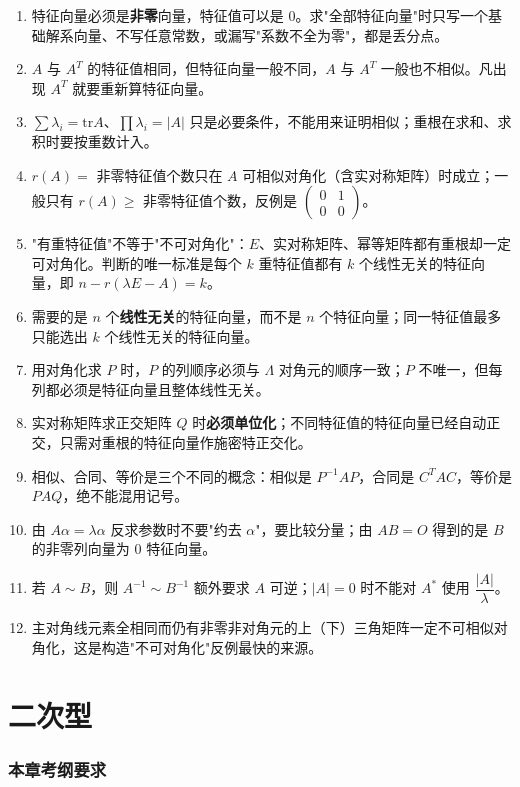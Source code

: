 \documentclass[11pt,openany,UTF8]{ctexbook}
\begin{document}
\begin{enumerate}
\item 特征向量必须是\textbf{非零}向量，特征值可以是 $0$。求"全部特征向量"时只写一个基础解系向量、不写任意常数，或漏写"系数不全为零"，都是丢分点。
\item $A$ 与 $A^T$ 的特征值相同，但特征向量一般不同，$A$ 与 $A^T$ 一般也不相似。凡出现 $A^T$ 就要重新算特征向量。
\item $\sum\lambda_i=\mathrm{tr}A$、$\prod\lambda_i=\vert A\vert$ 只是必要条件，不能用来证明相似；重根在求和、求积时要按重数计入。
\item $r(A)=$ 非零特征值个数只在 $A$ 可相似对角化（含实对称矩阵）时成立；一般只有 $r(A)\geq$ 非零特征值个数，反例是 $\begin{pmatrix}0&1\\0&0\end{pmatrix}$。
\item "有重特征值"不等于"不可对角化"：$E$、实对称矩阵、幂等矩阵都有重根却一定可对角化。判断的唯一标准是每个 $k$ 重特征值都有 $k$ 个线性无关的特征向量，即 $n-r(\lambda E-A)=k$。
\item 需要的是 $n$ 个\textbf{线性无关}的特征向量，而不是 $n$ 个特征向量；同一特征值最多只能选出 $k$ 个线性无关的特征向量。
\item 用对角化求 $P$ 时，$P$ 的列顺序必须与 $\Lambda$ 对角元的顺序一致；$P$ 不唯一，但每列都必须是特征向量且整体线性无关。
\item 实对称矩阵求正交矩阵 $Q$ 时\textbf{必须单位化}；不同特征值的特征向量已经自动正交，只需对重根的特征向量作施密特正交化。
\item 相似、合同、等价是三个不同的概念：相似是 $P^{-1}AP$，合同是 $C^TAC$，等价是 $PAQ$，绝不能混用记号。
\item 由 $A\alpha=\lambda\alpha$ 反求参数时不要"约去 $\alpha$"，要比较分量；由 $AB=O$ 得到的是 $B$ 的非零列向量为 $0$ 特征向量。
\item 若 $A\sim B$，则 $A^{-1}\sim B^{-1}$ 额外要求 $A$ 可逆；$\vert A\vert=0$ 时不能对 $A^*$ 使用 $\dfrac{\vert A\vert}{\lambda}$。
\item 主对角线元素全相同而仍有非零非对角元的上（下）三角矩阵一定不可相似对角化，这是构造"不可对角化"反例最快的来源。
\end{enumerate}
\chapter{二次型}
\subsection*{本章考纲要求}
\end{document}
